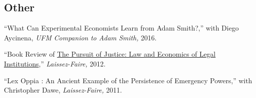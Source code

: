 \documentclass{article}%
\renewenvironment{itemize}{
\begin{list}{}{
\setlength{\leftmargin}{1.5em}
}
}{
\end{list}
}
\begin{document}
\subsection*{Other}
\begin{itemize}

\item ``What Can Experimental Economists Learn from Adam Smith?,'' with Diego Aycinena, \emph{UFM Companion to Adam Smith,} 2016.

\item ``Book Review of \underline{The Pursuit of Justice: Law and Economics of Legal Institutions},'' \emph{Laissez-Faire,} 2012.

\item ``Lex Oppia : An Ancient Example of the Persistence of Emergency Powers,'' with
Christopher Dawe, \emph{Laissez-Faire,} 2011.

\end{itemize}
\end{document}

